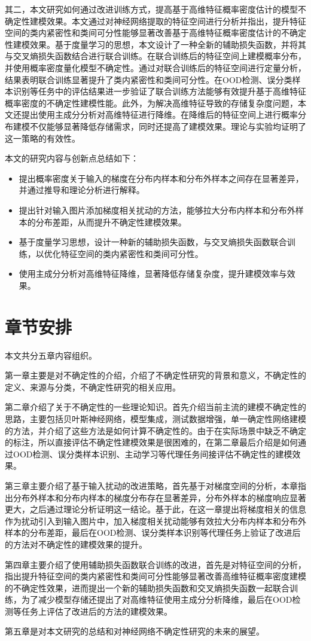 其二，本文研究如何通过改进训练方式，提高基于高维特征概率密度估计的模型不确定性建模效果。本文通过对神经网络提取的特征空间进行分析并指出，提升特征空间的类内紧密性和类间可分性能够显著改善基于高维特征概率密度估计的不确定性建模效果。基于度量学习的思想，本文设计了一种全新的辅助损失函数，并将其与交叉熵损失函数结合进行联合训练。在联合训练后的特征空间上建模概率分布，并使用概率密度量化模型不确定性。通过对联合训练后的特征空间进行定量分析，结果表明联合训练显著提升了类内紧密性和类间可分性。在OOD检测、误分类样本识别等任务中的评估结果进一步验证了联合训练方法能够有效提升基于高维特征概率密度的不确定性建模性能。此外，为解决高维特征导致的存储复杂度问题，本文还提出使用主成分分析对高维特征进行降维。在降维后的特征空间上进行概率分布建模不仅能够显著降低存储需求，同时还提高了建模效果。理论与实验均证明了这一策略的有效性。


本文的研究内容与创新点总结如下：
\begin{itemize}
    \item 提出概率密度关于输入的梯度在分布内样本和分布外样本之间存在显著差异，并通过推导和理论分析进行解释。
    \item 提出针对输入图片添加梯度相关扰动的方法，能够拉大分布内样本和分布外样本的分布差距，从而提升不确定性建模效果。
    \item 基于度量学习思想，设计一种新的辅助损失函数，与交叉熵损失函数联合训练，以优化特征空间的类内紧密性和类间可分性。
    \item 使用主成分分析对高维特征降维，显著降低存储复杂度，提升建模效率与效果。
\end{itemize}



\section{章节安排}
本文共分五章内容组织。

第一章主要是对不确定性的介绍，介绍了不确定性研究的背景和意义，不确定性的定义、来源与分类，不确定性研究的相关应用。

第二章介绍了关于不确定性的一些理论知识。首先介绍当前主流的建模不确定性的思路，主要包括贝叶斯神经网络，模型集成，测试数据增强，单一确定性网络建模的方法，并介绍了这些方法是如何计算不确定性的。由于在实际场景中缺乏不确定的标注，所以直接评估不确定性建模效果是很困难的，在第二章最后介绍是如何通过OOD检测、误分类样本识别、主动学习等代理任务间接评估不确定性的建模效果。

第三章主要介绍了基于输入扰动的改进策略，首先基于对梯度空间的分析，本章指出分布外样本和分布内样本的梯度分布存在显著差异，分布外样本的梯度响应显著更大，之后通过理论分析证明这一结论。基于此，在这一章提出将梯度相关的信息作为扰动引入到输入图片中，加入梯度相关扰动能够有效拉大分布内样本和分布外样本的分布差距，最后在OOD检测、误分类样本识别等代理任务上验证了改进后的方法对不确定性的建模效果的提升。

第四章主要介绍了使用辅助损失函数联合训练的改进，首先是对特征空间的分析，指出提升特征空间的类内紧密性和类间可分性能够显著改善高维特征概率密度建模的不确定性效果，进而提出一个新的辅助损失函数和交叉熵损失函数一起联合训练，为了减少模型存储还提出了对高维特征使用主成分分析降维，最后在OOD检测等任务上评估了改进后的方法的建模效果。

第五章是对本文研究的总结和对神经网络不确定性研究的未来的展望。
